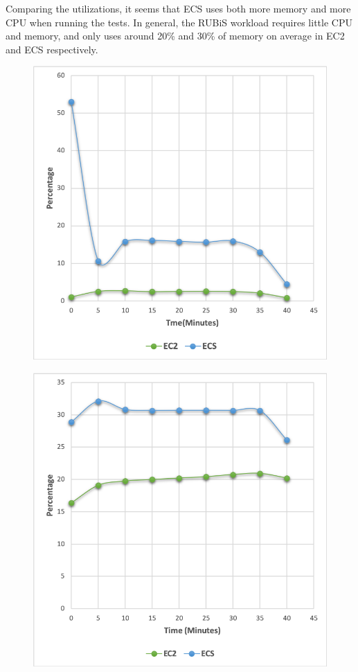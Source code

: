 \documentclass[11pt]{article}
\begin{document}
Comparing the utilizations, it seems that ECS uses both more memory and more CPU when running the tests. In general, the RUBiS workload requires little CPU and memory, and only uses around 20\% and 30\% of memory on average in EC2 and ECS respectively.

\begin{figure}
\centering
\begin{minipage}{.5\textwidth}
  \centering
  \includegraphics[scale=0.4]{CPU_rubis}
  \label{CPU}
\end{minipage}%
\begin{minipage}{.5\textwidth}
  \centering
  \includegraphics[scale=0.4]{Memory_rubis}
  \label{Memory}
\end{minipage}
\end{figure}
\end{document}

